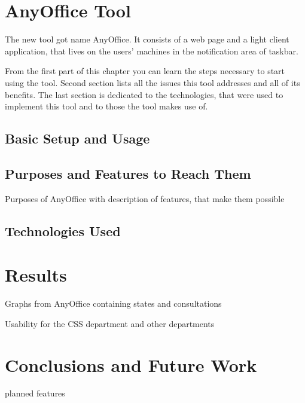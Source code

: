 \documentclass[11pt,singleside]{myfithesis2}
\begin{document}
\chapter{AnyOffice Tool}

The new tool got name AnyOffice. It consists of a web page and a light client application, that lives on the users' machines in the notification area of taskbar.

From the first part of this chapter you can learn the steps necessary to start using the tool. Second section lists all the issues this tool addresses and all of its benefits. The last section is dedicated to the technologies, that were used to implement this tool and to those the tool makes use of.

	\section{Basic Setup and Usage}



	\section{Purposes and Features to Reach Them}
Purposes of AnyOffice with description of features, that make them possible

	\section{Technologies Used}

\chapter{Results}
Graphs from AnyOffice containing states and consultations

Usability for the CSS department and other departments

\chapter{Conclusions and Future Work}

planned features



\clearpage
{}
{}
\end{document}
